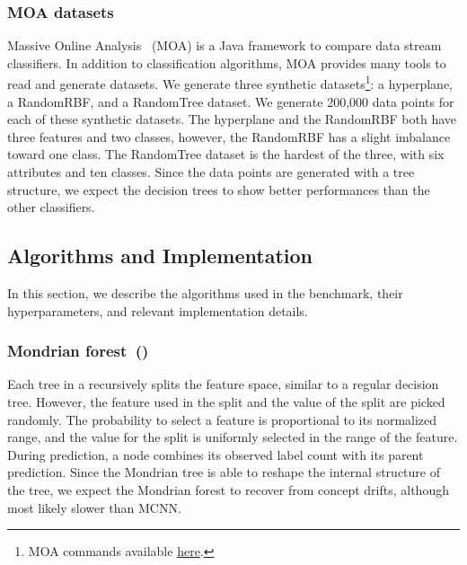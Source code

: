 \subsubsection{MOA datasets}
Massive Online Analysis~\cite{moa} (MOA) is a Java framework to compare
data stream classifiers. In addition to classification algorithms, MOA provides many
tools to read and generate
datasets.
We generate three synthetic datasets\footnote{MOA commands available
\href{https://github.com/big-data-lab-team/benchmark-har-data-stream/blob/f314bf4a258e96e418e249228897d269c59cd522/Makefile\#L104}{here}.}:
a hyperplane, a RandomRBF, and a RandomTree
dataset. We generate 200,000 data points
 for each of these synthetic datasets.
The hyperplane and the RandomRBF both have three features and two classes, however, the RandomRBF has a slight imbalance toward one class.
The RandomTree dataset is the hardest of the three, with six attributes and
ten classes. Since the data points are generated with a tree structure, we
expect the decision trees to show better performances than the other
classifiers.

\subsection{Algorithms and Implementation}
In this section, we describe the algorithms used in the benchmark, their
hyperparameters, and relevant implementation details. 

\subsubsection{Mondrian forest~(\mondrianforest)~\cite{mondrian2014}}
Each tree in a \mondrianforest recursively splits the feature space, similar to
a regular decision tree.  However, the feature used in the split and the value
of the split are picked randomly. The probability to select a feature is
proportional to its normalized range, and the value for the split is uniformly
selected in the range of the feature.  During prediction, a node combines its
observed label count with its parent prediction. Since the Mondrian tree is able
to reshape the internal structure of the tree, we expect the Mondrian forest to
recover from concept drifts, although most likely slower than MCNN.

